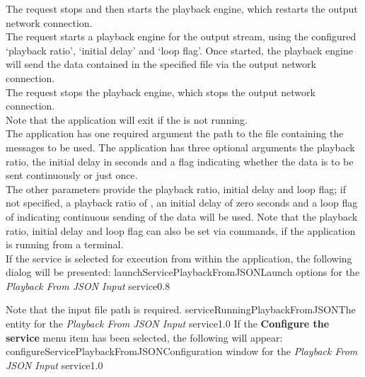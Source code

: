 The  request stops and then
starts the playback engine, which restarts the output \yarp{} network connection.\\

The  request starts a playback
engine for the output stream, using the configured `playback ratio', `initial delay' and
`loop flag'.
Once started, the playback engine will send the data contained in the specified file via
the output \yarp{} network connection.\\

The  request stops the playback
engine, which stops the output \yarp{} network connection.\\ 

Note that the application will exit if the  is not
running.\\

The application has one required argument \longDash{} the path to the \json{} file
containing the messages to be used.
The application has three optional arguments \longDash{} the playback ratio, the initial
delay in seconds and a flag indicating whether the data is to be sent continuously or just
once.
\insertAppParameters
\condPage
{}
\insertInputServiceComment\\

The other parameters provide the playback ratio, initial delay and loop flag; if not
specified, a playback ratio of , an initial delay of zero seconds and a loop
flag of  \longDash{} indicating continuous sending of the data \longDash{}
will be used.
Note that the playback ratio, initial delay and loop flag can also be set via commands,
if the application is running from a terminal.\\

\insertStandardServiceCommands
\condPage{}
If the service is selected for execution from within the \emph{\MMMU} application, the
following dialog will be presented:
%
{launchServicePlaybackFromJSON}{Launch options for the \emph{Playback From JSON Input}
service}{0.8}

Note that the input file path is required.
%
{serviceRunningPlaybackFromJSON}{The \emph{\MMMU} entity for the \emph{Playback From JSON
Input} service}{1.0}
\condPage{}
If the \textbf{Configure the service} menu item has been selected, the following will
appear:
%
{configureServicePlaybackFromJSON}{Configuration window for the \emph{Playback From JSON
Input} service}{1.0}

